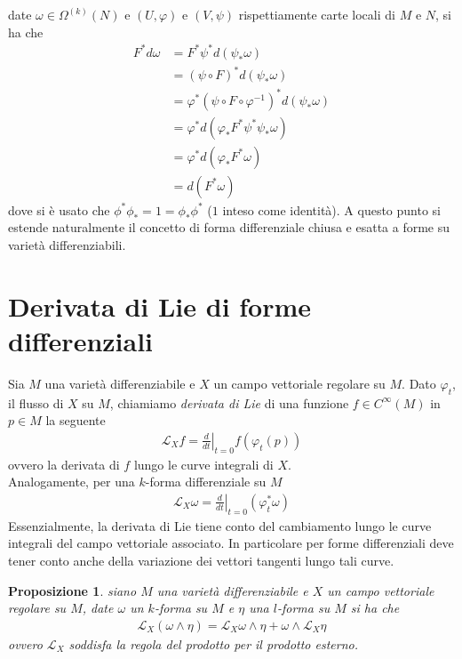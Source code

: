 \documentclass[twoside, 11pt]{amsbook}
\makeatletter
\newcommand{\0}{{(0)}}
\newcommand{\3}{{(3)}}
\theoremstyle{colonplain}
\newtheorem{prop}[thm]{Proposizione}
\theoremstyle{colondefinition}
\theoremstyle{colonremark}
\numberwithin{equation}{chapter}
\renewcommand{\proofname}{Dimostrazione}
\renewenvironment{proof}[1][\proofname]{\par
  \pushQED{\qed}%
  \normalfont \topsep6\p@\@plus6\p@\relax
  \trivlist
  \item[\hskip\labelsep\bfseries #1:]\ignorespaces
}{%
  \popQED\endtrivlist\@endpefalse
}
\makeatother
\begin{document}
\begin{proof} date $\omega \in \Omega^{(k)}(N)$ e $(U, \varphi)$ e $(V, \psi)$ rispettiamente carte locali di $M$ e $N$, si ha che
\begin{align}
    F^*d\omega &= F^*\psi^*d(\psi_*\omega) \\
    &= (\psi \circ F)^*d(\psi_*\omega) \\
    &= \varphi^*(\psi \circ F \circ \varphi^{-1})^*d(\psi_*\omega) \\
    &= \varphi^*d(\varphi_*F^*\psi^*\psi_*\omega) \\
    &= \varphi^*d(\varphi_*F^*\omega) \\
    &= d(F^*\omega)
\end{align}
dove si è usato che $\phi^*\phi_* = 1 = \phi_*\phi^*$ ($1$ inteso come identità).
\end{proof}
A questo punto si estende naturalmente il concetto di forma differenziale chiusa e esatta a forme su varietà differenziabili.

\section{Derivata di Lie di forme differenziali}
Sia $M$ una varietà differenziabile e $X$ un campo vettoriale regolare su $M$. Dato $\varphi_t$, il flusso di $X$ su $M$, chiamiamo \textit{derivata di Lie} di una funzione $f \in C^\infty(M)$ in $p \in M$ la seguente
\begin{align}
    \mathcal{L}_Xf = \left.\frac{d}{dt}\right|_{t = 0}f(\varphi_t(p))
\end{align}
ovvero la derivata di $f$ lungo le curve integrali di $X$. \\
Analogamente, per una $k$-forma differenziale su $M$
\begin{align}
    \mathcal{L}_X\omega = \left.\frac{d}{dt}\right|_{t = 0}(\varphi^*_t\omega)
\end{align}
Essenzialmente, la derivata di Lie tiene conto del cambiamento lungo le curve integrali del campo vettoriale associato. In particolare per forme differenziali deve tener conto anche della variazione dei vettori tangenti lungo tali curve.
\begin{prop} siano $M$ una varietà differenziabile e $X$ un campo vettoriale regolare su $M$, date $\omega$ un $k$-forma su $M$ e $\eta$ una $l$-forma su $M$ si ha che
\begin{align}
    \mathcal{L}_X(\omega \wedge \eta) = \mathcal{L}_X\omega \wedge \eta + \omega \wedge \mathcal{L}_X\eta
\end{align}
ovvero $\mathcal{L}_X$ soddisfa la regola del prodotto per il prodotto esterno.
\end{prop}
\end{document}
